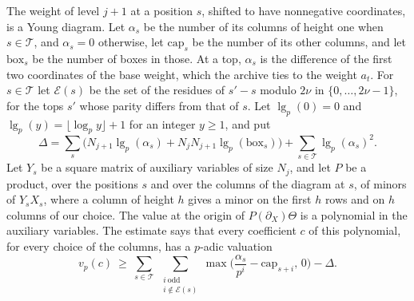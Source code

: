 \documentclass[11pt,letterpaper]{article}
\numberwithin{equation}{section}
\begin{document}
The weight of level $j+1$ at a position $s$, shifted to have nonnegative coordinates, is a Young diagram. Let $\alpha_s$ be the number of its columns of height one when $s\in\mathcal T$, and $\alpha_s=0$ otherwise, let $\mathrm{cap}_s$ be the number of its other columns, and let $\mathrm{box}_s$ be the number of boxes in those. At a top, $\alpha_s$ is the difference of the first two coordinates of the base weight, which the archive ties to the weight $a_t$. For $s\in\mathcal T$ let $\mathcal E(s)$ be the set of the residues of $s'-s$ modulo $2\nu$ in $\{0,\dots,2\nu-1\}$, for the tops $s'$ whose parity differs from that of $s$. Let $\operatorname{lg}_p(0)=0$ and $\operatorname{lg}_p(y)=\lfloor\log_py\rfloor+1$ for an integer $y\ge1$, and put
\[
\Delta=\sum_s\Big(N_{j+1}\operatorname{lg}_p(\alpha_s)+N_jN_{j+1}\operatorname{lg}_p(\mathrm{box}_s)\Big)+\sum_{s\in\mathcal T}\operatorname{lg}_p(\alpha_s)^2 .
\]
Let $Y_s$ be a square matrix of auxiliary variables of size $N_j$, and let $P$ be a product, over the positions $s$ and over the columns of the diagram at $s$, of minors of $Y_sX_s$, where a column of height $h$ gives a minor on the first $h$ rows and on $h$ columns of our choice. The value at the origin of $P(\partial_X)\Theta$ is a polynomial in the auxiliary variables. The estimate says that every coefficient $c$ of this polynomial, for every choice of the columns, has a $p$-adic valuation
\begin{equation}\label{valest}
v_p(c)\ \ge\ \sum_{s\in\mathcal T}\ \sum_{\substack{i\ \mathrm{odd}\\ i\notin\mathcal E(s)}}\max\Big(\frac{\alpha_s}{p^i}-\mathrm{cap}_{s+i},\,0\Big)-\Delta .
\end{equation}
\end{document}
